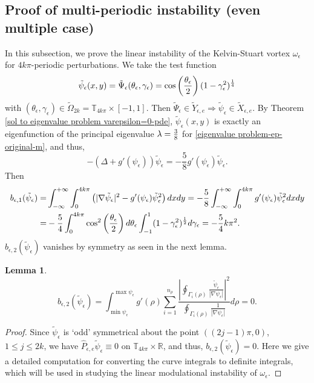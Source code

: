 \documentclass[1 [leqno, 11pt]{amsart}
\numberwithin{equation}{section}
\let\ep=\epsilon
\def\gep{\gamma_\epsilon}
\newtheorem{lemma}[Theorem]{Lemma}
\begin{document}
\begin{CJK*}{GBK}{song}
\subsection{Proof of multi-periodic instability   (even multiple case)}
In this subsection, we prove the linear instability of the  Kelvin-Stuart vortex $\omega_\ep$ for $4k\pi$-periodic perturbations. We take the test function
\begin{align}\label{test-even}
\tilde{\psi}_\ep(x, y)  =\tilde{\Psi}_\ep(\theta_\ep, \gamma_\ep)= \cos\left(\frac{\theta_\ep}{2}\right)(1-\gamma_\ep^2)^{1\over4}
\end{align}
with $(\theta_\ep, \gep) \in \tilde{\Omega}_{2k} = \mathbb{T}_{4k\pi} \times [-1, 1]$. Then $\tilde{\Psi}_\ep\in\tilde Y_{\ep,e}\Longrightarrow\tilde{\psi}_\ep\in\tilde X_{\ep,e}$. By Theorem \ref{sol to eigenvalue problem varepsilon=0-pde}, $\tilde{\psi}_\ep(x, y)$ is exactly an eigenfunction of the principal  eigenvalue  $\lambda={3\over 8}$ for
\eqref{eigenvalue problem-ep-original-m}, and thus,
$$-(\Delta +g'(\psi_\ep)) \tilde{\psi}_\ep = - \frac 5 8 g'(\psi_\ep)\tilde{\psi}_\ep.$$
Then
\begin{align}\nonumber
b_{\ep, 1}(\tilde{\psi}_\ep)
= & \int_{-\infty}^{+\infty} \int_0^{4k\pi} \left(|\nabla \tilde{\psi}_\ep|^2 - g'(\psi_\epsilon)\tilde{\psi}_\ep^2 \right)dx dy
=  -{5\over8}\int_{-\infty}^{+\infty} \int_0^{4k\pi} g'(\psi_\ep)\tilde{\psi}_\ep^2dx dy \\\label{b1-even}
= & -{5\over4} \int_0^{4k\pi}  \cos^2\left(\frac{\theta_\ep}{2}\right)d \theta_\ep\int_{-1}^{1} (1-\gamma_\ep^2)^{1\over2} d\gep
=  -{5\over4}k\pi^2.
\end{align}
$b_{\ep, 2}(\tilde{\psi}_\ep)$ vanishes by symmetry as seen in the next lemma.
\begin{lemma}\label{b2-even}
$$ b_{\ep, 2}(\tilde{\psi}_\ep) =  \int_{\min \psi_\ep}^{\max \psi_\ep} g'(\rho) \sum_{i=1}^{n_\rho} \frac{\left|\oint_{\Gamma_i (\rho)} \frac{\tilde{\psi}_\ep}{|\nabla \psi_\ep|}\right|^2}{\oint_{\Gamma_i (\rho)} \frac{1}{|\nabla \psi_\ep|}} d\rho = 0.$$
\end{lemma}
\begin{proof} Since $\tilde{\psi}_\ep$ is   `odd'   symmetrical about the point $( (2j-1)\pi,0)$, $1\leq j\leq 2k$, we have $\hat{P}_{\ep,e}\tilde{\psi}_\ep \equiv0$ on $\mathbb{T}_{4k\pi}\times\mathbb{R}$, and thus, $b_{\ep, 2}(\tilde{\psi}_\ep)=0$.
 Here we give a detailed computation for converting the curve integrals to  definite integrals, which will be used in studying the linear modulational instability of $\omega_\ep$.

\end{proof}
\end{CJK*}
\end{document}
